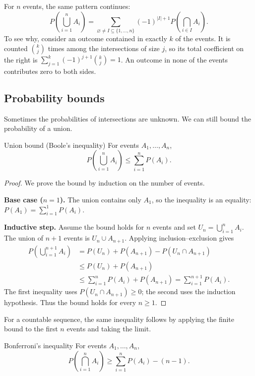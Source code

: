 \documentclass[a4paper,12pt,oneside]{report}
\begin{document}
For $n$ events, the same pattern continues:
\[
  P\!\left(\bigcup_{i=1}^{n}A_i\right)
  =\sum_{\varnothing\neq I\subseteq\{1,\ldots,n\}}
     (-1)^{|I|+1}P\!\left(\bigcap_{i\in I}A_i\right).
\]
To see why, consider an outcome contained in exactly $k$ of the
events. It is counted $\binom{k}{j}$ times among the intersections
of size $j$, so its total coefficient on the right is
$\sum_{j=1}^{k}(-1)^{j+1}\binom{k}{j}=1$. An outcome in none of the
events contributes zero to both sides.

\subsection{Probability bounds}

Sometimes the probabilities of intersections are unknown. We can
still bound the probability of a union.

\begin{framedprop}{Union bound (Boole's inequality)}
For events $A_1,\ldots,A_n$,
\[
  P\!\left(\bigcup_{i=1}^{n} A_i\right)
  \leq \sum_{i=1}^{n}P(A_i).
\]
\end{framedprop}

\begin{proof}
We prove the bound by induction on the number of events.

\textbf{Base case ($n=1$).} The union contains only $A_1$, so the
inequality is an equality: $P(A_1)=\sum_{i=1}^{1}P(A_i)$.

\textbf{Inductive step.} Assume the bound holds for $n$ events and set
$U_n=\bigcup_{i=1}^{n}A_i$. The union of $n+1$ events is
$U_n\cup A_{n+1}$. Applying inclusion--exclusion gives
\[
\begin{aligned}
P\!\left(\bigcup_{i=1}^{n+1}A_i\right)
 &=P(U_n)+P(A_{n+1})-P(U_n\cap A_{n+1})\\
 &\leq P(U_n)+P(A_{n+1})\\
 &\leq \sum_{i=1}^{n}P(A_i)+P(A_{n+1})
  =\sum_{i=1}^{n+1}P(A_i).
\end{aligned}
\]
The first inequality uses $P(U_n\cap A_{n+1})\geq0$; the second uses
the induction hypothesis. Thus the bound holds for every $n\geq1$.
\end{proof}

For a countable sequence, the same inequality follows by applying
the finite bound to the first $n$ events and taking the limit.

\begin{framedprop}{Bonferroni's inequality}
For events $A_1,\ldots,A_n$,
\[
  P\!\left(\bigcap_{i=1}^{n} A_i\right)
  \geq \sum_{i=1}^{n}P(A_i)-(n-1).
\]
\end{framedprop}
\end{document}
